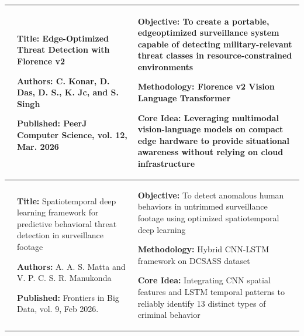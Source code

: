 \begin{center}
\begin{longtable}{
        |>{\centering\arraybackslash}m{1.22cm}
        |>{\raggedright\arraybackslash}m{6.3cm}
        |>{\raggedright\arraybackslash}m{6.3cm}|
        }
        2                                                                                            &
        \textbf{Title:} Edge-Optimized Threat Detection with Florence v2 \par
        \textbf{Authors:} C. Konar, D. Das, D. S., K. Jc, and S. Singh  \par
        \textbf{Published:} PeerJ
        Computer Science, vol. 12, Mar. 2026                                                         &
        \textbf{Objective:} To create a portable, edgeoptimized surveillance system capable of detecting military-relevant threat classes in resource-constrained environments \par
        \textbf{Methodology:} Florence v2 Vision Language Transformer \par
        \textbf{Core Idea:} Leveraging multimodal vision-language models on compact edge hardware to provide situational awareness without relying on cloud infrastructure                 \\
        \hline

        3                                                                                            &
        \textbf{Title:} Spatiotemporal deep learning framework for predictive behavioral threat detection in surveillance footage \par
        \textbf{Authors:} A. A. S. Matta and V. P. C. S. R. Manukonda \par
        \textbf{Published:} Frontiers in
        Big Data, vol. 9, Feb 2026.                                                                  &
        \textbf{Objective:} To detect anomalous human behaviors in untrimmed surveillance footage using optimized spatiotemporal deep learning \par
        \textbf{Methodology:} Hybrid CNN-LSTM framework on DCSASS dataset \par
        \textbf{Core Idea:} Integrating CNN spatial features and LSTM temporal patterns to reliably identify 13 distinct types of criminal behavior                                        \\
        \hline


\end{longtable}
\end{center}
